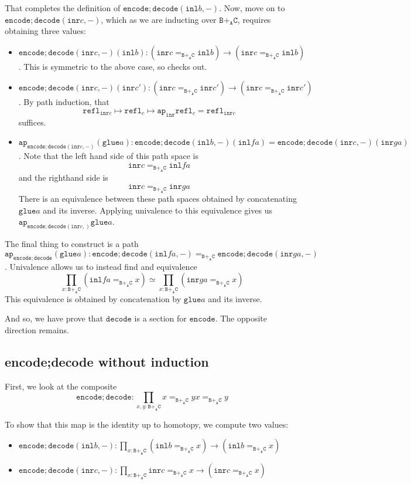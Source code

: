 \message{ !name(notes.tex)}\documentclass[12pt]{amsart}
\newcommand{\from}{\colon}
\newcommand{\type}[1]{\mathtt{#1}}
\newcommand{\tin}{\colon}
\newcommand{\A}{\type{A}}
\newcommand{\B}{\type{B}}
\newcommand{\C}{\type{C}}
\newcommand{\BAC}{\B +_{\A} \C}
\newcommand{\ap}{\type{ap}}
\newcommand{\inl}{\type{inl}}
\newcommand{\inr}{\type{inr}}
\newcommand{\glue}{\type{glue}}
\newcommand{\refl}{\type{refl}}
\newcommand{\encode}{\type{encode}}
\newcommand{\decode}{\type{decode}}
\theoremstyle{remark}
\theoremstyle{definition}
\begin{document}
That completes the definition of \( \encode ; \decode (\inl b, -)
\). Now, move on to \( \encode ; \decode ( \inr c, - ) \), which as we
are inducting over \( \BAC \), requires obtaining three values:
\begin{itemize}
\item
  \( \encode ; \decode ( \inr c , - ) ( \inl b ) \from ( \inr c
  =_{\BAC} \inl b ) \to ( \inr c =_{\BAC} \inl b )  \). This is
  symmetric to the above case, so checks out. 
\item
  \( \encode ; \decode ( \inr c , - ) ( \inr c' ) \from ( \inr c
  =_{\BAC} \inr c' ) \to ( \inr c =_{\BAC} \inr c' )  \). By path
  induction, that
  \[
    \refl_{\inr c} \mapsto \refl_c \mapsto \ap_{\inr} \refl_c =
    \refl_{\inr c}
  \]
  suffices.  
\item
  \( \ap_{\encode ; \decode ( \inr c, -)} (\glue a) \tin \encode ; \decode
  (\inl b , -)(\inl fa) = \encode ; \decode (\inr c , -)(\inr ga)
  \).  Note that the left hand side of this path space is
  \[
    \inr c =_{\BAC} \inl fa
  \]
  and the righthand side is
  \[
    \inr c =_{\BAC} \inr ga
  \]
  There is an equivalence between these path spaces obtained by
  concatenating \( \glue a \) and its inverse. Applying univalence to
  this equivalence gives us \( \ap_{\encode ; \decode (\inr c , )}
  \glue a \).
\end{itemize}

The final thing to construct is a path
\( \ap_{\encode ; \decode} (\glue a ) \tin \encode ; \decode ( \inl fa
, - ) =_{\BAC} \encode ; \decode (\inr ga , -) \). Univalence allows
us to instead find and equivalence
\[
  \prod\limits_{x \tin \BAC} ( \inl fa =_{\BAC} x )
  \simeq
  \prod\limits_{x \tin \BAC} ( \inr ga =_{\BAC} x )
\]
This equivalence is obtained by concatenation by \( \glue a \) and its
inverse.

And so, we have prove that \( \decode \) is a section for \( \encode
\). The opposite direction remains.

\subsection{encode;decode without induction}

First, we look at the composite
\[
  \encode ; \decode
  \from
  \prod\limits_{x,y \tin \BAC} x =_{\BAC} y
  x =_{\BAC} y
\]

To show that this map is the identity up to homotopy, we compute two values:
\begin{itemize}
\item
  \( \encode ; \decode ( \inl b , - ) \from \prod\limits_{x \tin
  \BAC} ( \inl b =_{\BAC} x ) \to ( \inl b =_{\BAC} x ) \)
\item
  \( \encode ; \decode ( \inr c , - ) \from \prod\limits_{x \tin
  \BAC} \inr c =_{\BAC} x \to ( \inr c =_{\BAC} x ) \)
\end{itemize}
\end{document}
